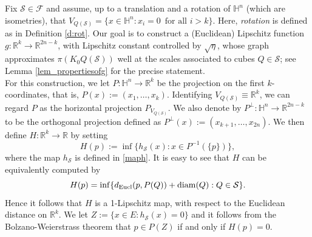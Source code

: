 \documentclass[12pt]{amsart}
\newcommand{\R}{\mathbb R}
\renewcommand{\H}{\mathbb H}
\newcommand{\diam}{{\rm diam}}
\numberwithin{equation}{section}
\theoremstyle{plain}
\theoremstyle{definition}
\theoremstyle{remark}
\begin{document}
Fix $\mathcal S\in\mathcal F$ and assume, up to a translation and a rotation of $\H^n$ (which are isometries), that $V_{Q(\mathcal S)}=\{x\in\H^n:x_i=0\,\text{ for all }i>k\}$.
Here, \emph{rotation} is defined as in Definition \ref{d:rot}.
Our goal is to construct a (Euclidean) Lipschitz function $g:\R^k\to\R^{2n-k}$, %
 with Lipschitz constant controlled by $\sqrt{\eta}$, whose graph approximates $\pi(K_0Q(\mathcal S))$ well  at  the  scales associated to cubes $Q\in\mathcal S$; see Lemma \ref{lem_propertiesofg} for the precise statement. \medskip\\ %
For this construction, we let $P:\H^n\to \R^k$ be the projection on the first $k$-coordinates, that is, $P(x):=(x_1,\dots,x_k)$. Identifying $V_{Q(\mathcal S)}\equiv\R^k$, we can regard $P$ as the horizontal projection $P_{V_{Q(\mathcal S)}}$. We also denote by $P^\perp:\H^n\to\R^{2n-k}$ to be the orthogonal projection %
defined as $P^\perp(x):=(x_{k+1},\dots,x_{2n}).$
We then define $H:\R^k\to\R$ by setting
\[H(p):=\inf\{h_\mathcal S(x): x\in P^{-1}(\{p\})\},\] where the map $h_\mathcal S$ is defined in \eqref{maph}. It is easy to see that $H$ can be equivalently computed by
\begin{equation}\label{def_H}H(p)=\inf\{d_{\mathrm{Eucl}}(p,P(Q))+\diam(Q): Q\in\mathcal S\}.\end{equation}
Hence it follows that $H$ is a 1-Lipschitz map, with respect to the Euclidean distance on $\R^k$.
We let $Z:=\{x\in E: h_\mathcal S(x)=0\}$ and it follows from the Bolzano-Weierstrass theorem that $p\in P(Z)$ if and only if $H(p)=0$. 
\end{document}
